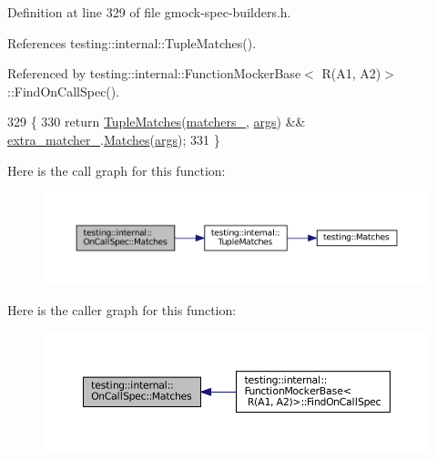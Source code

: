 Definition at line 329 of file gmock-\/spec-\/builders.\+h.



References testing\+::internal\+::\+Tuple\+Matches().



Referenced by testing\+::internal\+::\+Function\+Mocker\+Base$<$ R(\+A1, A2)$>$\+::\+Find\+On\+Call\+Spec().


\begin{DoxyCode}
329                                                 \{
330     \textcolor{keywordflow}{return} \hyperlink{namespacetesting_1_1internal_a10095d1e1c99369200072b39d657ebc4}{TupleMatches}(\hyperlink{classtesting_1_1internal_1_1OnCallSpec_a3938ebe6cb9bc385956358e354a67673}{matchers\_}, \hyperlink{namespacegenerate__debs_a75f9143e38df82d83b2e8a6f99cae02c}{args}) && 
      \hyperlink{classtesting_1_1internal_1_1OnCallSpec_ab9c4a32626e40be4b40824815128f099}{extra\_matcher\_}.\hyperlink{classtesting_1_1internal_1_1MatcherBase_a3b479673ff40cac1a7d548e91d789cb2}{Matches}(\hyperlink{namespacegenerate__debs_a75f9143e38df82d83b2e8a6f99cae02c}{args});
331   \}
\end{DoxyCode}
Here is the call graph for this function\+:
\nopagebreak
\begin{figure}[H]
\begin{center}
\leavevmode
\includegraphics[width=350pt]{classtesting_1_1internal_1_1OnCallSpec_a8113d1ec5775715637a87875dee6cc68_cgraph}
\end{center}
\end{figure}
Here is the caller graph for this function\+:
\nopagebreak
\begin{figure}[H]
\begin{center}
\leavevmode
\includegraphics[width=350pt]{classtesting_1_1internal_1_1OnCallSpec_a8113d1ec5775715637a87875dee6cc68_icgraph}
\end{center}
\end{figure}
\mbox{\label{classtesting_1_1internal_1_1OnCallSpec_a1c6303bf46983f20f4d2a61752fa8663}} 
